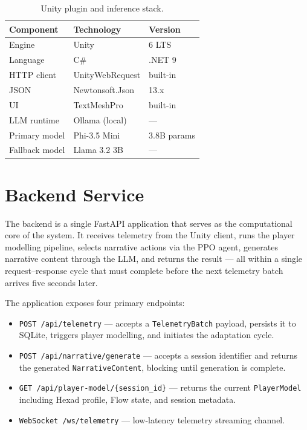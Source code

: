 \begin{table}[H]
\centering
\caption{Unity plugin and inference stack.}
\label{tab:unity_stack}
\small
\begin{tabular}{@{}lll@{}}
\toprule
\textbf{Component} & \textbf{Technology} & \textbf{Version} \\
\midrule
Engine & Unity & 6 LTS \\
Language & C\# & .NET 9 \\
HTTP client & UnityWebRequest & built-in \\
JSON & Newtonsoft.Json & 13.x \\
UI & TextMeshPro & built-in \\
\midrule
LLM runtime & Ollama (local) & --- \\
Primary model & Phi-3.5 Mini & 3.8B params \\
Fallback model & Llama 3.2 3B & --- \\
\bottomrule
\end{tabular}
\end{table}

\section{Backend Service}

The backend is a single FastAPI application that serves as the computational core of the system. It receives telemetry from the Unity client, runs the player modelling pipeline, selects narrative actions via the PPO agent, generates narrative content through the LLM, and returns the result --- all within a single request--response cycle that must complete before the next telemetry batch arrives five seconds later.

The application exposes four primary endpoints:

\begin{itemize}
\item \texttt{POST /api/telemetry} --- accepts a \texttt{TelemetryBatch} payload, persists it to SQLite, triggers player modelling, and initiates the adaptation cycle.
\item \texttt{POST /api/narrative/generate} --- accepts a session identifier and returns the generated \texttt{NarrativeContent}, blocking until generation is complete.
\item \texttt{GET /api/player-model/\{session\_id\}} --- returns the current \texttt{PlayerModel} including Hexad profile, Flow state, and session metadata.
\item \texttt{WebSocket /ws/telemetry} --- low-latency telemetry streaming channel.
\end{itemize}

